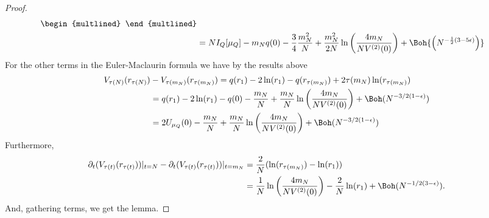 \begin{proof}
\begin{align}
\begin{multlined}
	\end{multlined} \\
	& = N I_Q[\mu_Q]  - m_N q(0) - \frac{3}{4} \frac{m_N^2}{N} + \frac{m_N^2}{2N} \ln{\left( \frac{4 m_N}{N V^{(2)}(0)} \right)} + \Boh{\left(N^{-\frac{1}{2}(3-5\epsilon)}\right)}
\end{align}
For the other terms in the Euler-Maclaurin formula we have by the results above
\begin{align}
	V_{\tau(N)}(r_{\tau(N)})  &- V_{\tau{(m_N)}}(r_{\tau(m_N)}) = q(r_1) - 2 \ln(r_1) - q(r_{\tau(m_N)}) + 2 \tau(m_N) \ln(r_{\tau(m_N)}) \\
	& = q(r_1) - 2 \ln(r_1) - q(0) - \frac{m_N}{N} + \frac{m_N}{N} \ln{\left(\frac{4 m_N}{N V^{(2)}(0)}\right)} + \Boh(N^{-3/2(1-\epsilon)}) \\
	& = 2 U_{\mu_Q}(0) - \frac{m_N}{N} + \frac{m_N}{N} \ln{\left(\frac{4 m_N}{N V^{(2)}(0)}\right)} + \Boh(N^{-3/2(1-\epsilon)})
\end{align}
Furthermore,
\begin{align}
		\partial_t (V_{\tau(t)}(r_{\tau(t)})) |_{t=N} - \partial_t (V_{\tau(t)}(r_{\tau(t)})) |_{t=m_N} & = \frac{2}{N}(\ln(r_{\tau(m_N)}) - \ln(r_1)) \\
		& = \frac{1}{N} \ln{\left(\frac{4 m_N}{N V^{(2)}(0)}\right)}  - \frac{2}{N} \ln(r_1) + \Boh(N^{-1/2(3-\epsilon)}).
\end{align}
And, gathering terms, we get the lemma.
\end{proof}

